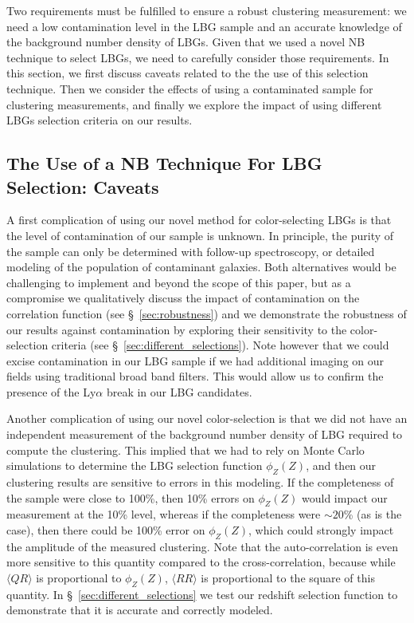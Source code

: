 \documentclass[iop, revtex4]{emulateapj}
\begin{document}
Two requirements must be fulfilled to ensure a robust clustering measurement: 
we need a low contamination level in the LBG sample and an accurate knowledge 
of the background number density of LBGs. Given that we used a novel NB 
technique to select LBGs, we need to carefully consider those requirements. 
In this section, we first discuss caveats related to the 
the use of this selection technique. Then we consider the effects of
using a contaminated sample for clustering measurements, and finally we
explore the impact of using different LBGs selection criteria on our
results.

\subsection{The Use of a NB Technique For LBG Selection: Caveats} 
\label{sec:technique_caveats}

A first complication of using our novel method for
color-selecting LBGs is that the level of contamination of our sample is
unknown.  
In principle, the
purity of the sample can only be determined with follow-up spectroscopy, or detailed
modeling of the population of contaminant galaxies.
Both alternatives would be challenging to implement and beyond the scope of
this paper, but as a compromise we qualitatively discuss the impact of
contamination on the correlation function (see
\S~\ref{sec:robustness}) and we demonstrate the robustness of our
results against contamination by exploring their sensitivity
to the color-selection criteria  (see \S~\ref{sec:different_selections}).
Note however that we could excise contamination in our LBG sample if 
we had additional imaging on our fields using traditional broad band filters. This would allow us to confirm
 the presence of the Ly$\alpha$ break in our LBG candidates.

Another complication of using our novel color-selection is that we did not have
an independent measurement of the background number density of LBG required to compute the clustering. This implied
that we had to rely on Monte Carlo simulations to determine the LBG selection function $\phi_{Z}(Z)$,
and then our clustering results are sensitive to errors in this modeling.
 If the completeness of the sample were close to 100\%, then 10\% errors on $\phi_{Z}(Z)$ would impact our measurement at the 10\%
level, whereas if the completeness were $\sim20$\% (as is the case), then there could be 100\% error on $\phi_{Z}(Z)$, which could
 strongly impact the amplitude of the measured clustering. 
Note that the auto-correlation is even more sensitive to
this quantity compared to the cross-correlation, because while
$\langle QR\rangle$ is proportional to $\phi_{Z}(Z)$, $\langle RR\rangle$
is proportional to the square of this quantity. In \S~\ref{sec:different_selections}
we test our redshift selection function to demonstrate that it is accurate and correctly modeled.
\end{document}
